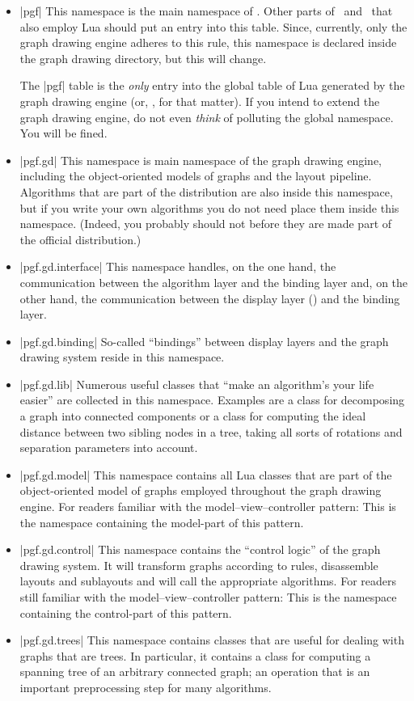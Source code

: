 \begin{itemize}
\item |pgf| This namespace is the main namespace of \pgfname. Other
  parts of \pgfname\ and \tikzname\ that also employ Lua should put an
  entry into this table. Since, currently, only the graph drawing
  engine adheres to this rule, this namespace is declared inside the
  graph drawing directory, but this will change.

  The |pgf| table is the \emph{only} entry into the global table of
  Lua generated by the graph drawing engine (or, \pgfname, for that
  matter). If you intend to extend the graph drawing engine, do not
  even \emph{think} of polluting the global namespace. You will be
  fined.
\item |pgf.gd| This namespace is main namespace of the graph drawing
  engine, including the object-oriented models of graphs and the
  layout pipeline. Algorithms that are part of the
  distribution are also inside this namespace, but if you write your
  own algorithms you do not need place them inside this
  namespace. (Indeed, you probably should not before they are made
  part of the official distribution.)
\item |pgf.gd.interface| This namespace handles, on the one hand, the
  communication between the algorithm layer and the binding layer and,
  on the other hand, the communication between the display layer
  (\tikzname) and the binding layer.
\item |pgf.gd.binding| So-called ``bindings'' between display layers
  and the graph drawing system reside in this namespace.
\item |pgf.gd.lib| Numerous useful classes that ``make an algorithm's
  your life easier'' are collected in this namespace. Examples are a
  class for decomposing a graph into connected components or a class
  for computing the ideal distance between two sibling nodes in a
  tree, taking all sorts of rotations and separation parameters into
  account. 
\item |pgf.gd.model| This namespace contains all Lua classes that are
  part of the object-oriented model of graphs employed
  throughout the graph drawing engine. For readers familiar with the
  model--view--controller pattern: This is the namespace containing
  the model-part of this pattern.
\item |pgf.gd.control| This namespace contains the ``control logic''
  of the graph drawing system. It will transform graphs according to
  rules, disassemble layouts and sublayouts and will call the
  appropriate algorithms. For readers still familiar with the
  model--view--controller pattern: This is the namespace containing
  the control-part of this pattern. 
\item |pgf.gd.trees| This namespace contains classes that are useful
  for dealing with graphs that are trees. In particular, it contains a
  class for computing a spanning tree of an arbitrary connected graph;
  an operation that is an important preprocessing step for many
  algorithms.


\end{itemize}
